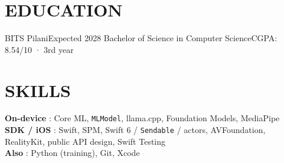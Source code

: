 \section{EDUCATION}
  \resumeSubHeadingListStart
    \resumeSubheading
      {BITS Pilani}{Expected 2028}
      {Bachelor of Science in Computer Science}{CGPA: 8.54/10 · 3rd year}
  \resumeSubHeadingListEnd

\section{SKILLS}
 \begin{itemize}[leftmargin=0in, label={}]
    \small{\item{
     \textbf{On-device} {: Core ML, \texttt{MLModel}, llama.cpp, Foundation Models, MediaPipe} \vspace{1pt} \\
     \textbf{SDK / iOS} {: Swift, SPM, Swift 6 / \texttt{Sendable} / actors, AVFoundation, RealityKit, public API design, Swift Testing} \vspace{1pt} \\
     \textbf{Also} {: Python (training), Git, Xcode}
    }}
 \end{itemize}


